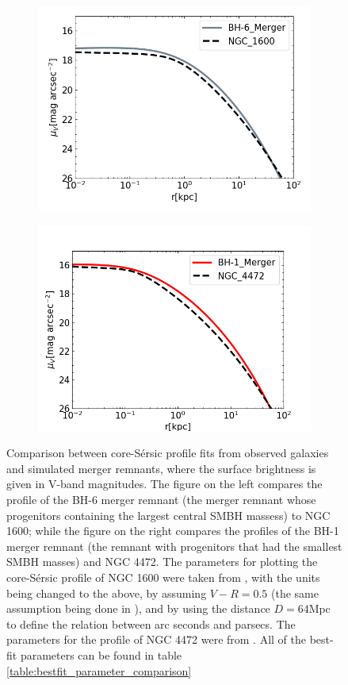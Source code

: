 \documentclass[english, oneside]{HYgradu}
\begin{document}
\begin{figure}
	\centering
	\begin{subfigure}[b]{0.49\textwidth}
		\includegraphics[width=\textwidth]{BH-6_NGC1600.png}
	\end{subfigure}
	\begin{subfigure}[b]{0.49\textwidth}
		\includegraphics[width=\textwidth]{BH-1_NGC4472.png}
	\end{subfigure}
	\caption{Comparison between core-Sérsic profile fits from observed galaxies and simulated merger remnants, where the surface brightness is given in V-band magnitudes. The figure on the left compares the profile of the BH-6 merger remnant (the merger remnant whose progenitors containing the largest central SMBH massess) to NGC 1600; while the figure on the right compares the profiles of the BH-1 merger remnant (the remnant with progenitors that had the smallest SMBH masses) and NGC 4472. The parameters for plotting the core-Sérsic profile of NGC 1600 were taken from \cite{Thomas2016}, with the units being changed to the above, by assuming $V - R = 0.5$ (the same assumption being done in \cite{Lauer2007}), and by using the distance $D = 64 \mathrm{Mpc}$ \citep{Thomas2016} to define the relation between arc seconds and parsecs. The parameters for the profile of NGC 4472 were from \cite{Rusli2013}. All of the best-fit parameters can be found in table \ref{table:bestfit_parameter_comparison}}

\end{figure}
\end{document}
